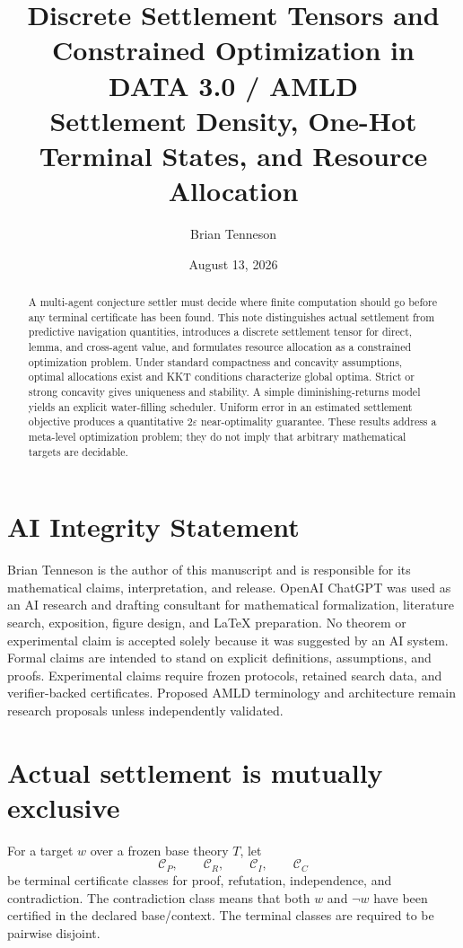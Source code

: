 \documentclass[11pt]{article}
\title{\textbf{Discrete Settlement Tensors and Constrained Optimization in DATA 3.0 / AMLD}\\[4pt]\large Settlement Density, One-Hot Terminal States, and Resource Allocation}
\author{Brian Tenneson}
\date{August 13, 2026}
\newcommand{\Sset}{\mathcal C}
\begin{document}
\maketitle

\begin{abstract}
A multi-agent conjecture settler must decide where finite computation should go before any terminal certificate has been found. This note distinguishes actual settlement from predictive navigation quantities, introduces a discrete settlement tensor for direct, lemma, and cross-agent value, and formulates resource allocation as a constrained optimization problem. Under standard compactness and concavity assumptions, optimal allocations exist and KKT conditions characterize global optima. Strict or strong concavity gives uniqueness and stability. A simple diminishing-returns model yields an explicit water-filling scheduler. Uniform error in an estimated settlement objective produces a quantitative $2\varepsilon$ near-optimality guarantee. These results address a meta-level optimization problem; they do not imply that arbitrary mathematical targets are decidable.
\end{abstract}

\section*{AI Integrity Statement}
Brian Tenneson is the author of this manuscript and is responsible for its mathematical claims, interpretation, and release. OpenAI ChatGPT was used as an AI research and drafting consultant for mathematical formalization, literature search, exposition, figure design, and LaTeX preparation. No theorem or experimental claim is accepted solely because it was suggested by an AI system. Formal claims are intended to stand on explicit definitions, assumptions, and proofs. Experimental claims require frozen protocols, retained search data, and verifier-backed certificates. Proposed AMLD terminology and architecture remain research proposals unless independently validated.

\section{Actual settlement is mutually exclusive}
For a target $w$ over a frozen base theory $T$, let
\[
\Sset_P,\qquad \Sset_R,\qquad \Sset_I,\qquad \Sset_C
\]
be terminal certificate classes for proof, refutation, independence, and contradiction. The contradiction class means that both $w$ and $\neg w$ have been certified in the declared base/context. The terminal classes are required to be pairwise disjoint.
\end{document}
